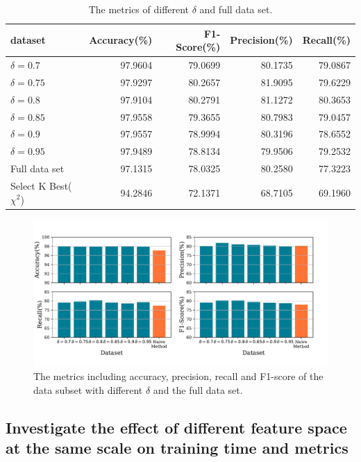 \documentclass{ieeeaccess}
\theoremstyle{definition}
\begin{document}
\begin{table}
    \centering
    \caption{The metrics of different $\delta$ and full data set.}
    \label{tab:metric-full}
    \begin{tabular}{lrrrr}
        \toprule
        dataset & Accuracy(\%) & F1-Score(\%) & Precision(\%) & Recall(\%) \\
        \midrule
            $\delta=0.7$ &  97.9604 & 79.0699 & 80.1735 & 79.0867 \\
            $\delta=0.75$ &	97.9297 & 80.2657 & 81.9095 & 79.6229 \\
            $\delta=0.8$ &	97.9104 & 80.2791 & 81.1272 & 80.3653 \\
            $\delta=0.85$ &	97.9558 & 79.3655 & 80.7983 & 79.0457 \\
            $\delta=0.9$ &  97.9557 & 78.9994 & 80.3196 & 78.6552 \\
            $\delta=0.95$ &	97.9489 & 78.8134 & 79.9506 & 79.2532 \\
            Full data set &	97.1315 & 78.0325 & 80.2580 & 77.3223 \\
            Select K Best($\chi^2$) & 94.2846 & 72.1371 & 68.7105 & 69.1960 \\
        \bottomrule
    \end{tabular}
\end{table}

\begin{figure}[!htpb]
    \centering
    \includegraphics[scale=0.35]{fig/metrics-full.pdf}
    \caption{The metrics including accuracy, precision, recall and F1-score of the data subset with different $\delta$ and the full data set.}
    \label{fig:metrics-full}
\end{figure}

\subsection{Investigate the effect of different feature space at the same scale on training time and metrics}
\end{document}
